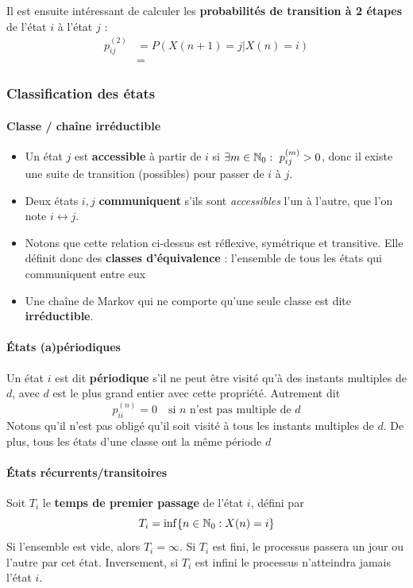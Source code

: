 \documentclass[11pt,a4paper]{article}
\numberwithin{equation}{section}
\begin{document}
Il est ensuite intéressant de calculer les \textbf{probabilités de transition à 2 étapes} de l'état $i$ à l'état $j$ :
\[\begin{array}{ll}
    p_{ij}^{(2)}   &= P(X(n+1) = j | X(n) = i) \\
                   &= 
\end{array}\]

\subsubsection{Classification des états}
\paragraph{Classe / chaîne irréductible}
\begin{itemize}
    \item Un état $j$ est \textbf{accessible} à partir de $i$ si $\exists m \in \mathbb{N}_0:\ p_{ij}^{(m)} > 0$, donc il existe une suite de transition (possibles) pour passer de $i$ à $j$.
    \item Deux états $i,j$ \textbf{communiquent} s'ils sont \textit{accessibles} l'un à l'autre, que l'on note $i \leftrightarrow j$.
    \item Notons que cette relation ci-dessus est réflexive, symétrique et transitive. Elle définit donc des \textbf{classes d'équivalence} : l'ensemble de tous les états qui communiquent entre eux
    \item Une chaîne de Markov qui ne comporte qu'une seule classe est dite \textbf{irréductible}.
\end{itemize}

\paragraph{États (a)périodiques}
Un état $i$ est dit \textbf{périodique} s'il ne peut être visité qu'à des instants multiples de $d$, avec $d$ est le plus grand entier avec cette propriété. Autrement dit 
\[p^{(n)}_{ii} = 0 \quad \text{si $n$ n'est pas multiple de $d$}\]
Notons qu'il n'est pas obligé qu'il soit visité à tous les instants multiples de $d$. De plus, tous les états d'une classe ont la même période $d$

\paragraph{États récurrents/transitoires}
Soit $T_i$ le \textbf{temps de premier passage} de l'état $i$, défini par 
\begin{equation}
    T_i = \inf\{n \in \mathbb{N}_0 : X(n) = i\}
\end{equation}
Si l'ensemble est vide, alors $T_i = \infty$. Si $T_i$ est fini, le processus passera un jour ou l'autre par cet état. Inversement, si $T_i$ est infini le processus n'atteindra jamais l'état $i$. 
\end{document}
